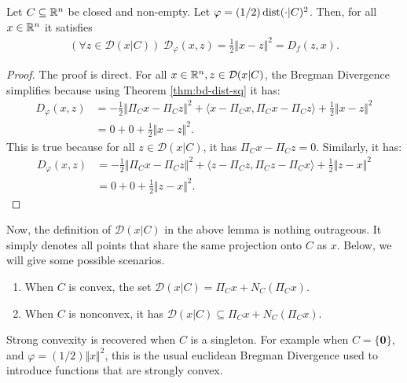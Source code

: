 \documentclass[12pt]{article}
\begin{document}
    \begin{lemma}
        Let $C \subseteq \mathbb R^n$ be closed and non-empty. 
        Let $\varphi = (1/2)\operatorname{dist}(\cdot | C)^2$.
        Then, for all $x \in \mathbb R^n$ it satisfies
        \begin{align*}
            (\forall z \in \mathcal D(x | C))\; \mathcal D_\varphi(x, z) = \frac{1}{2}\Vert x - z\Vert^2 = D_f(z, x). 
        \end{align*}
    \end{lemma}
    \begin{proof}
        The proof is direct. 
        For all $x \in \mathbb R^n, z \in \mathcal D(x | C)$, the Bregman Divergence simplifies because using Theorem \ref{thm:bd-dist-sq} it has: 
        \begin{align*}
            D_\varphi (x, z) &= 
            - \frac{1}{2}\Vert \Pi_C x - \Pi_C z\Vert^2 
            + \langle x - \Pi_C x, \Pi_C x - \Pi_C z\rangle 
            + \frac{1}{2}\Vert x - z\Vert^2
            \\
            &= 0 + 0 + \frac{1}{2}\Vert x - z\Vert^2. 
        \end{align*}
        This is true because for all $z \in \mathcal D(x | C)$, it has $\Pi_C x - \Pi_C z = 0$. 
        Similarly, it has: 
        \begin{align*}
            D_\varphi(x, z) &= 
            - \frac{1}{2}\Vert \Pi_C x - \Pi_C z\Vert^2 
            + \langle z - \Pi_C z, \Pi_C z - \Pi_C x\rangle
            + \frac{1}{2}\Vert z - x\Vert^2
            \\
            &= 0 + 0 + \frac{1}{2}\Vert z - x\Vert^2. 
        \end{align*}
    \end{proof}
    \par
    Now, the definition of $\mathcal D(x | C)$ in the above lemma is nothing outrageous. 
    It simply denotes all points that share the same projection onto $C$ as $x$. 
    Below, we will give some possible scenarios. 
    \begin{enumerate}
        \item When $C$ is convex, the set $\mathcal D(x | C) = \Pi_C x + N_C(\Pi_C x)$. 
        \item When $C$ is nonconvex, it has $\mathcal D(x | C) \subseteq \Pi_C x + N_C(\Pi_C x)$. 
    \end{enumerate}
    Strong convexity is recovered when $C$ is a singleton. 
    For example when $C = \{\mathbf 0\}$, and $\varphi = (1/2)\Vert x\Vert^2$, this is the usual euclidean Bregman Divergence used to introduce functions that are strongly convex. 
\end{document}
